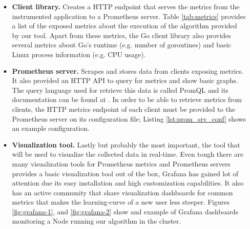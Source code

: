 \begin{itemize}
	\item \textbf{Client library.} Creates a HTTP endpoint that serves the metrics from the instrumented application to a Prometheus server. Table \ref{tab:metrics} provides a list of the exposed metrics about the execution of the algorithm provided by our tool. Apart from these metrics, the Go client library also provides several metrics about Go's runtime (e.g. number of goroutines) and basic Linux process information (e.g. CPU usage).
	
	\item \textbf{Prometheus server.} Scrapes and stores data from clients exposing metrics. It also provided an HTTP API to query for metrics and show basic graphs. The query language used for retrieve this data is called PromQL and its documentation can be found at \cite{promQL}. In order to be able to retrieve metrics from clients, the HTTP metrics endpoint of each client must be provided to the Prometheus server on its configuration file; Listing \ref{lst:prom_srv_conf} shows an example configuration.
	
	\item \textbf{Visualization tool.} Lastly but probably the most important, the tool that will be used to visualize the collected data in real-time. Even tough there are many visualization tools for Prometheus metrics and Prometheus servers provides a basic visualization tool out of the box, Grafana has gained lot of attention due its easy installation and high customization capabilities. It also has an active community that share visualization dashboards for common metrics that makes the learning-curve of a new user less steeper. Figures \ref{fig:grafana-1}, and \ref{fig:grafana-2} show and example of Grafana dashboards monitoring a Node running our algorithm in the cluster.
\end{itemize}

